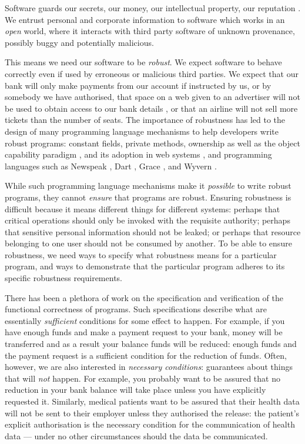 Software guards our secrets, our money, our intellectual property,
our reputation \cite{covern}.  We entrust personal and
corporate information to software which works in an \emph{open} world, 
where  it interacts with 
third party software of unknown provenance, possibly buggy and potentially malicious.

This means we need our software to be \emph{robust}.
We expect software to behave correctly even if  used 
by erroneous or malicious third parties.
 We expect that our bank will only make payments 
from our account if instructed by us, or by somebody we have authorised, 
that space on a web given to an advertiser will not be used
to obtain access to our bank details \cite{cwe}, or that an
airline will not sell more tickets than the number of seats.
The importance of robustness has led to the design of many programming
language mechanisms to help developers write robust programs:
constant fields, private methods, ownership \cite{ownalias}
as well as the object capability paradigm \cite{MillerPhD},
and its adoption in  web systems
\cite{CapJavaHayesAPLAS17,CapNetSocc17Eide,DOCaT14}, and programming languages such as Newspeak
\cite{newspeak17}, Dart \cite{dart15},
Grace \cite{grace,graceClasses}, and Wyvern \cite{wyverncapabilities}.

While such programming language mechanisms make it \textit{possible} to write robust
programs, they cannot \textit{ensure} that programs are robust.
Ensuring robustness is difficult because it means 
different things for different systems: perhaps
that critical operations should only be invoked with the requisite authority;
perhaps that sensitive personal information should not be leaked; 
or perhaps that resource belonging to one user should not be consumed by another.
%
To be able to ensure robustness, we need ways to specify what robustness means for a 
particular program, and ways to demonstrate that the particular program 
adheres to its specific robustness requirements.

There has been a plethora of work on the specification and verification of the
functional correctness of programs. Such specifications describe what are
essentially \emph{sufficient} conditions for some
effect to happen. For example, if you have enough funds and make a payment request to your bank, money will be transferred
and as a result your balance funds will be reduced: enough funds and the payment request is a sufficient condition for the
reduction of funds.
Often, however, we are also interested in \emph{necessary conditions}:
guarantees about things that will  \emph{not} happen.
%
For example, you  probably 
want to be assured that no reduction in your bank balance will take place unless you have
explicitly requested it. Similarly, medical patients want  to be assured  that   their health data will not be sent to  their employer  
unless they authorised the release:
the patient's explicit authorisation is the
necessary condition for the communication of health data --- under no
other circumstances should the data be communicated.

